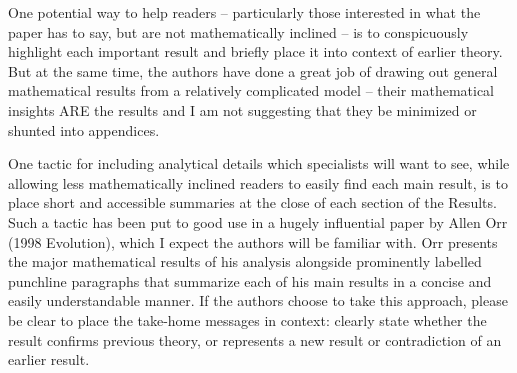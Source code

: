 \documentclass[10pt,letterpaper]{article}
\begin{document}
One potential way to help readers -- particularly those interested in what the paper has to say, but are not mathematically inclined -- is to conspicuously highlight each important result and briefly place it into context of earlier theory. But at the same time, the authors have done a great job of drawing out general mathematical results from a relatively complicated model -- their mathematical insights ARE the results and I am not suggesting that they be minimized or shunted into appendices.

One tactic for including analytical details which specialists will want to see, while allowing less mathematically inclined readers to easily find each main result, is to place short and accessible summaries at the close of each section of the Results. Such a tactic has been put to good use in a hugely influential paper by Allen Orr (1998 Evolution), which I expect the authors will be familiar with. Orr presents the major mathematical results of his analysis alongside prominently labelled punchline paragraphs that summarize each of his main results in a concise and easily understandable manner. If the authors choose to take this approach, please be clear to place the take-home messages in context: clearly state whether the result confirms previous theory, or represents a new result or contradiction of an earlier result.
\end{document}

